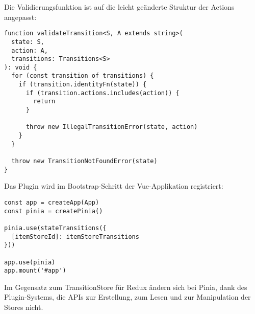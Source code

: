 Die Validierungsfunktion ist auf die leicht geänderte Struktur der Actions angepasst:

\begin{lstlisting}
function validateTransition<S, A extends string>(
  state: S,
  action: A,
  transitions: Transitions<S>
): void {
  for (const transition of transitions) {
    if (transition.identityFn(state)) {
      if (transition.actions.includes(action)) {
        return
      }

      throw new IllegalTransitionError(state, action)
    }
  }

  throw new TransitionNotFoundError(state)
}
\end{lstlisting}

Das Plugin wird im Bootstrap-Schritt der Vue-Applikation registriert:

\begin{lstlisting}
const app = createApp(App)
const pinia = createPinia()

pinia.use(stateTransitions({
  [itemStoreId]: itemStoreTransitions
}))

app.use(pinia)
app.mount('#app')
\end{lstlisting}

Im Gegensatz zum TransitionStore für Redux ändern sich bei Pinia, dank des Plugin-Systems, die APIs zur Erstellung, zum Lesen und zur Manipulation der Stores nicht.
